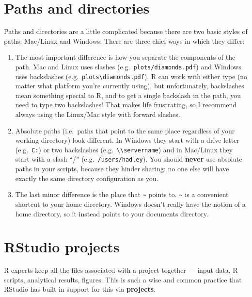\documentclass[letterpaper,12pt,twoside,]{pinp}
\begin{document}
\hypertarget{paths-and-directories}{%
\section{Paths and directories}\label{paths-and-directories}}

Paths and directories are a little complicated because there are two
basic styles of paths: Mac/Linux and Windows. There are three chief ways
in which they differ:

\begin{enumerate}
\def\labelenumi{\arabic{enumi}.}
\item
  The most important difference is how you separate the components of
  the path. Mac and Linux uses slashes
  (e.g.~\texttt{plots/diamonds.pdf}) and Windows uses backslashes
  (e.g.~\texttt{plots\textbackslash{}diamonds.pdf}). R can work with
  either type (no matter what platform you're currently using), but
  unfortunately, backslashes mean something special to R, and to get a
  single backslash in the path, you need to type two backslashes! That
  makes life frustrating, so I recommend always using the Linux/Mac
  style with forward slashes.
\item
  Absolute paths (i.e.~paths that point to the same place regardless of
  your working directory) look different. In Windows they start with a
  drive letter (e.g.~\texttt{C:}) or two backslashes
  (e.g.~\texttt{\textbackslash{}\textbackslash{}servername}) and in
  Mac/Linux they start with a slash ``/'' (e.g.~\texttt{/users/hadley}).
  You should \textbf{never} use absolute paths in your scripts, because
  they hinder sharing: no one else will have exactly the same directory
  configuration as you.
\item
  The last minor difference is the place that \texttt{\textasciitilde{}}
  points to. \texttt{\textasciitilde{}} is a convenient shortcut to your
  home directory. Windows doesn't really have the notion of a home
  directory, so it instead points to your documents directory.
\end{enumerate}

\hypertarget{rstudio-projects}{%
\section{RStudio projects}\label{rstudio-projects}}

R experts keep all the files associated with a project together ---
input data, R scripts, analytical results, figures. This is such a wise
and common practice that RStudio has built-in support for this via
\textbf{projects}.
\end{document}
